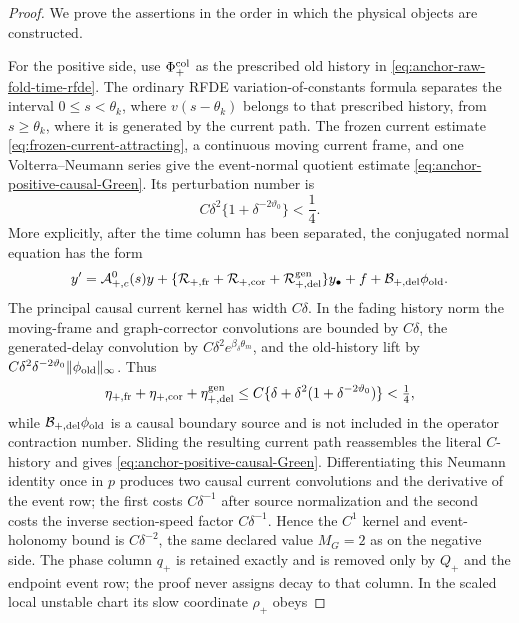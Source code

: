 \begin{proof}
We prove the assertions in the order in which the physical objects are
constructed.

For the positive side, use \(\Phi_+^{\rm col}\) as the prescribed old
history in \cref{eq:anchor-raw-fold-time-rfde}.  The ordinary RFDE
variation-of-constants formula separates the interval
\(0\le s<\theta_k\), where \(v(s-\theta_k)\) belongs to that prescribed
history, from \(s\ge\theta_k\), where it is generated by the current path.
The frozen current estimate
\cref{eq:frozen-current-attracting}, a continuous moving current frame,
and one Volterra--Neumann series give the event-normal quotient estimate
\cref{eq:anchor-positive-causal-Green}.  Its perturbation number is
\[
 C\delta^2\{1+\delta^{-2\vartheta_0}\}<\frac14.
\]
More explicitly, after the time column has been separated, the conjugated
normal equation has the form
\[
 y'=\mathcal A_{+,c}^0(s)y+
   \{\mathcal R_{+,{\rm fr}}+\mathcal R_{+,{\rm cor}}
      +\mathcal R_{+,{\rm del}}^{\rm gen}\}y_\bullet+f
   +\mathcal B_{+,{\rm del}}\phi_{\rm old}.
\]
The principal causal current kernel has width \(C\delta\).  In the fading
history norm the moving-frame and graph-corrector convolutions are bounded
by \(C\delta\), the generated-delay convolution by
\(C\delta^2e^{\beta_\delta\theta_m}\), and the old-history lift by
\(C\delta^2\delta^{-2\vartheta_0}\|\phi_{\rm old}\|_\infty\).  Thus
\begin{equation}
 \eta_{+,{\rm fr}}+\eta_{+,{\rm cor}}
   +\eta_{+,{\rm del}}^{\rm gen}
 \le C\{\delta+\delta^2(1+\delta^{-2\vartheta_0})\}<\tfrac14,
                                                               \label{eq:anchor-positive-Green-component-ledger}
\end{equation}
while \(\mathcal B_{+,{\rm del}}\phi_{\rm old}\) is a causal boundary
source and is not included in the operator contraction number.  Sliding the
resulting current path reassembles the literal \(C\)-history and gives
\cref{eq:anchor-positive-causal-Green}.  Differentiating this Neumann
identity once in \(p\) produces two causal current convolutions and the
derivative of the event row; the first costs \(C\delta^{-1}\) after source
normalization and the second costs the inverse section-speed factor
\(C\delta^{-1}\).  Hence the \(C^1\) kernel and event-holonomy bound is
\(C\delta^{-2}\), the same declared value \(M_G=2\) as on the negative
side.
The phase column \(q_+\) is retained exactly and is removed only by
\(Q_+\) and the endpoint event row; the proof never assigns decay to that
column.
In the scaled local unstable chart its slow coordinate \(\rho_+\) obeys

\end{proof}
